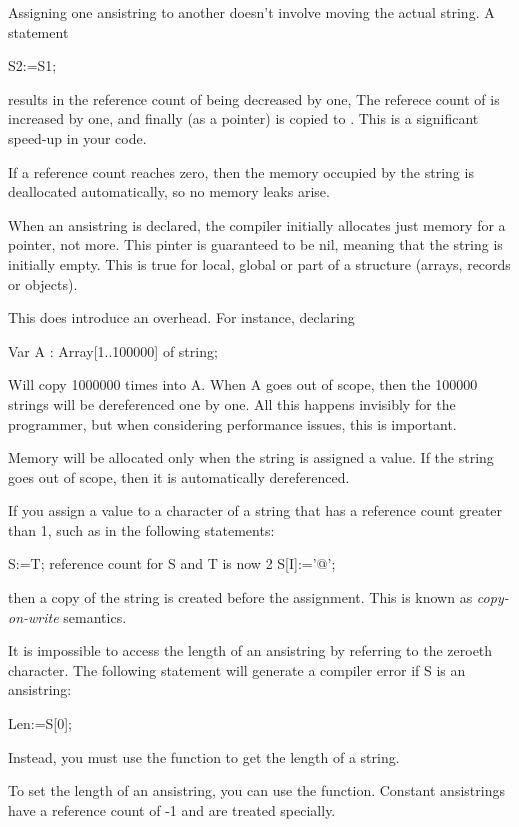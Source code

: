 \documentclass{report}
\begin{document}
Assigning one ansistring to another doesn't involve moving the actual
string. A statement
\begin{listing}
  S2:=S1;
\end{listing}
results in the reference count of  being decreased by one,
The referece count of  is increased by one, and finally 
(as a pointer) is copied to . This is a significant speed-up in
your code. 

If a reference count reaches zero, then the memory occupied by the
string is deallocated automatically, so no memory leaks arise.

When an ansistring is declared, the \fpc compiler initially 
allocates just memory for a pointer, not more. This pinter is guaranteed
to be nil, meaning that the string is initially empty. This is
true for local, global or part of a structure (arrays, records or objects).

This does introduce an overhead. For instance, declaring
\begin{listing}
Var 
  A : Array[1..100000] of string;
\end{listing}
Will copy 1000000 times  into A. When A goes out of scope, then
the 100000 strings will be dereferenced one by one. All this happens
invisibly for the programmer, but when considering performance issues,
this is important.

Memory will be allocated only when the string is assigned a value.
If the string goes out of scope, then it is automatically dereferenced.

If you assign a value to a character of a string that has a reference count
greater than 1, such as in the following
statements:
\begin{listing}
  S:=T;  { reference count for S and T is now 2 }
  S[I]:='@';
\end{listing}
then a copy of the string is created before the assignment. This is known
as {\em copy-on-write} semantics.

It is impossible to access the length of an ansistring by referring to 
the zeroeth character. The following statement will generate a compiler
error if S is an ansistring:
\begin{listing}
  Len:=S[0];
\end{listing}
Instead, you must use the  function to get the length of a 
string.

To set the length of an ansistring, you can use the 
function.
Constant ansistrings have a reference count of -1 and are treated specially.
\end{document}
